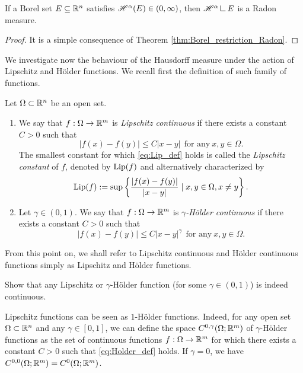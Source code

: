 \begin{proposition}
If a Borel set $E \subseteq \mathbb{R}^n$ satisfies $\mathscr{H}^{\alpha}(E) \in
(0,\infty)$, then $\Haus{\alpha} \res E$ is a Radon measure.
\end{proposition}
\begin{proof}
It is a simple consequence of Theorem \ref{thm:Borel_restriction_Radon}. 
\end{proof}

We investigate now the behaviour of the Hausdorff measure under the action of Lipschitz and H\"older functions. We recall first the definition of such family of functions.

\begin{definition} Let $\Omega \subset \mathbb{R}^{n}$ be an open set.
\begin{enumerate}[(1)]
\item We say that $f : \Omega \to \mathbb{R}^{m}$ is {\em Lipschitz continuous} if there exists a constant $C > 0$ such that
\begin{equation} \label{eq:Lip_def}
|f(x) - f(y)| \le C |x - y| \ \ \text{for any} \ x, y \in \Omega.
\end{equation}
The smallest constant for which \eqref{eq:Lip_def} holds is called the {\em Lipschitz constant} of $f$, denoted by $\operatorname{Lip}(f)$ and alternatively characterized by
\begin{equation}
\operatorname{Lip}(f) := \sup \left \{ \frac{|f(x) - f(y)|}{|x - y|} \mid x, y \in \Omega, x \neq y \right \}.
\end{equation}
\item Let $\gamma \in (0,1)$. We say that $f: \Omega \to \mathbb{R}^{m}$ is {\em $\gamma$-H\"older continuous} if there exists a constant $C > 0$ such that
\begin{equation} \label{eq:Holder_def}
|f(x) - f(y)| \le C |x - y|^{\gamma} \ \ \text{for any} \ x, y \in \Omega.
\end{equation}
\end{enumerate}
\end{definition}

From this point on, we shall refer to Lipschitz continuous and H\"older continuous functions simply as Lipschitz and H\"older functions. 

\begin{exercise}
Show that any Lipschitz or $\gamma$-H\"older function (for some $\gamma \in (0,1)$) is indeed continuous.
\end{exercise}

\begin{remark} \label{rem:Lip_Holder}
Lipschitz functions can be seen as $1$-H\"older functions. Indeed, for any open set $\Omega \subset \mathbb{R}^{n}$ and any $\gamma \in [0, 1]$, we can define the space $C^{0, \gamma}(\Omega; \mathbb{R}^{m})$ of $\gamma$-H\"older functions as the set of continuous functions $f : \Omega \to \mathbb{R}^{m}$ for which there exists a constant $C > 0$ such that \eqref{eq:Holder_def} holds. If $\gamma = 0$, we have $C^{0, 0}(\Omega; \mathbb{R}^{m}) = C^{0}(\Omega; \mathbb{R}^{m})$. 
\end{remark}

